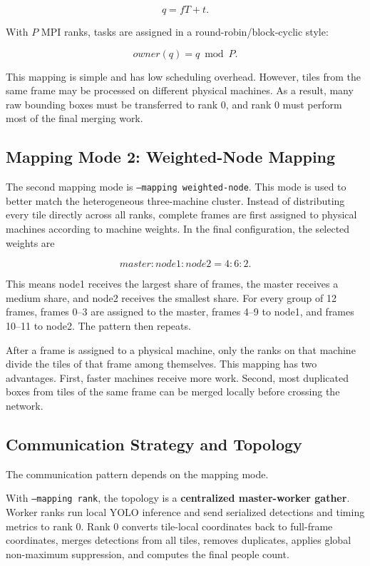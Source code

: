 \[
q = fT + t.
\]

With $P$ MPI ranks, tasks are assigned in a round-robin/block-cyclic style:

\[
owner(q) = q \bmod P.
\]

This mapping is simple and has low scheduling overhead. However, tiles from the same frame may be processed on different physical machines. As a result, many raw bounding boxes must be transferred to rank 0, and rank 0 must perform most of the final merging work.

\subsection{Mapping Mode 2: Weighted-Node Mapping}

The second mapping mode is \texttt{--mapping weighted-node}. This mode is used to better match the heterogeneous three-machine cluster. Instead of distributing every tile directly across all ranks, complete frames are first assigned to physical machines according to machine weights. In the final configuration, the selected weights are

\[
master : node1 : node2 = 4 : 6 : 2.
\]

This means node1 receives the largest share of frames, the master receives a medium share, and node2 receives the smallest share. For every group of 12 frames, frames 0--3 are assigned to the master, frames 4--9 to node1, and frames 10--11 to node2. The pattern then repeats.

After a frame is assigned to a physical machine, only the ranks on that machine divide the tiles of that frame among themselves. This mapping has two advantages. First, faster machines receive more work. Second, most duplicated boxes from tiles of the same frame can be merged locally before crossing the network.

\subsection{Communication Strategy and Topology}

The communication pattern depends on the mapping mode.

With \texttt{--mapping rank}, the topology is a \textbf{centralized master-worker gather}. Worker ranks run local YOLO inference and send serialized detections and timing metrics to rank 0. Rank 0 converts tile-local coordinates back to full-frame coordinates, merges detections from all tiles, removes duplicates, applies global non-maximum suppression, and computes the final people count.

